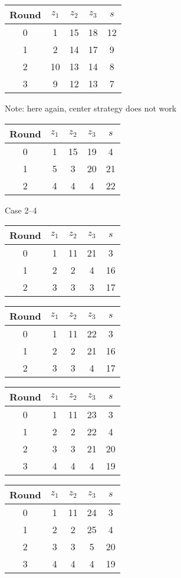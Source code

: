 \begin{tabular}{c | c | c | c | c }
Round & $z_1$ & $z_2$ & $z_3$ & $s$ \\
\hline
0 & 1 & 15 & 18 & 12 \\
1 & 2 & 14 & 17 & 9 \\
2 & 10 & 13 & 14 & 8 \\
3 & 9 & 12 & 13 & 7
\end{tabular}
Note: here again, center strategy does not work

\begin{tabular}{c | c | c | c | c }
Round & $z_1$ & $z_2$ & $z_3$ & $s$ \\
\hline
0 & 1 & 15 & 19 & 4 \\
1 & 5 & 3 & 20 & 21 \\
2 & 4 & 4 & 4 & 22
\end{tabular}



Case 2--4

\begin{tabular}{c | c | c | c | c }
Round & $z_1$ & $z_2$ & $z_3$ & $s$ \\
\hline
0 & 1 & 11 & 21 & 3 \\
1 & 2 & 2 & 4 & 16 \\
2 & 3 & 3 & 3 & 17
\end{tabular}

\begin{tabular}{c | c | c | c | c }
Round & $z_1$ & $z_2$ & $z_3$ & $s$ \\
\hline
0 & 1 & 11 & 22 & 3 \\
1 & 2 & 2 & 21 & 16 \\
2 & 3 & 3 & 4 & 17
\end{tabular}

\begin{tabular}{c | c | c | c | c }
Round & $z_1$ & $z_2$ & $z_3$ & $s$ \\
\hline
0 & 1 & 11 & 23 & 3 \\
1 & 2 & 2 & 22 & 4 \\
2 & 3 & 3 & 21 & 20 \\
3 & 4 & 4 & 4 & 19
\end{tabular}

\begin{tabular}{c | c | c | c | c }
Round & $z_1$ & $z_2$ & $z_3$ & $s$ \\
\hline
0 & 1 & 11 & 24 & 3 \\
1 & 2 & 2 & 25 & 4 \\
2 & 3 & 3 & 5 & 20 \\
3 & 4 & 4 & 4 & 19
\end{tabular}

